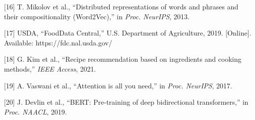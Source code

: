 \documentclass[10pt,conference,compsoc]{IEEEtran}
\begin{document}
{[}16{]} T. Mikolov et al., ``Distributed representations of words and
phrases and their compositionality (Word2Vec),'' in \emph{Proc.
NeurIPS}, 2013.

{[}17{]} USDA, ``FoodData Central,'' U.S. Department of Agriculture,
2019. {[}Online{]}. Available: https://fdc.nal.usda.gov/

{[}18{]} G. Kim et al., ``Recipe recommendation based on ingredients and
cooking methods,'' \emph{IEEE Access}, 2021.

{[}19{]} A. Vaswani et al., ``Attention is all you need,'' in
\emph{Proc. NeurIPS}, 2017.

{[}20{]} J. Devlin et al., ``BERT: Pre-training of deep bidirectional
transformers,'' in \emph{Proc. NAACL}, 2019.
\end{document}
